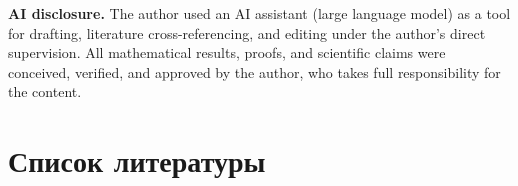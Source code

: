 \documentclass[12pt]{iopart}
\begin{document}
\textbf{AI disclosure.} The author used an AI assistant (large language model) as a tool for drafting, literature cross-referencing, and editing under the author's direct supervision. All mathematical results, proofs, and scientific claims were conceived, verified, and approved by the author, who takes full responsibility for the content.




\section*{Список литературы}


\end{document}
